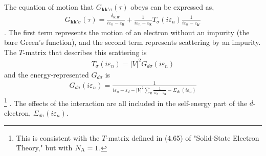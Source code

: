 \documentclass[a4j]{jarticle}
\begin{document}
The equation of motion that $G_{\bm{k}\bm{k}' \sigma}(\tau)$ obeys can be expressed as,
\begin{align}
	G_{\bm{k}\bm{k}' \sigma}(\tau)
	=
	\frac{\delta_{\bm{k},\bm{k}'}}{
		i \varepsilon_{n} - \varepsilon_{\bm{k}}
	}
	+
	\frac{1}{
		i \varepsilon_{n} - \varepsilon_{\bm{k}}
	}
	T_{\sigma}(i \varepsilon_{n})
	\frac{1}{
		i \varepsilon_{n} - \varepsilon_{\bm{k}'}
	}
\end{align}
.
The first term represents the motion of an electron without an impurity (the bare Green's function), and the second term represents scattering by an impurity.
The $T$-matrix that describes this scattering is
\begin{align}
	T_{\sigma}(i \varepsilon_{n})
	=
	|V|^{2}
	G_{d \sigma}(i \varepsilon_{n})
\end{align}
and the energy-represented $G_{d \sigma}$ is
\begin{align}
	G_{d \sigma}(i \varepsilon_{n})
	=
	\frac{1}{
		\displaystyle
		i \varepsilon_{n}
		-
		\varepsilon_{d}
		-
		|V|^{2}
		\displaystyle
		\sum_{\bm{k}}
		\frac{1}{
			i \varepsilon_{n} - \varepsilon_{\bm{k}}
		}
		-
		\Sigma_{d\sigma}(i \varepsilon_{n})
	}
\end{align}
\footnote{
	This is consistent with the $T$-matrix defined in (4.65) of "Solid-State Electron Theory," but with $N_{\rm A}=1$.
}
.
The effects of the interaction are all included in the self-energy part of the $d$-electron, $\Sigma_{d\sigma}(i \varepsilon_{n})$.
\end{document}
